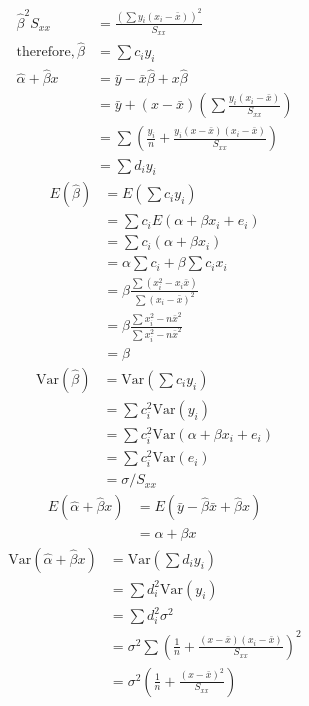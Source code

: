\documentclass{article}
\begin{document}
\begin{align*}
	\widehat{\beta}^2 S_{xx} &= \frac{(\sum y_i(x_i - \bar{x}))^2}{S_{xx}} \\
	\text{therefore,}\, \widehat{\beta}
	&= \boxed{\sum c_i y_i} \\
	\widehat{\alpha} + \widehat{\beta}x
	&= \bar{y} - \bar{x} \widehat{\beta} + x \widehat{\beta} \\
	&= \bar{y} + (x - \bar{x}) \left(\sum \frac{y_i (x_i - \bar{x})}{S_{xx}}\right) \\
	&= \sum \left(\frac{y_i}{n} + \frac{y_i (x - \bar{x})(x_i - \bar{x})}{S_{xx}}\right) \\
	&= \boxed{\sum d_i y_i}
\end{align*}
\begin{align*}
	E\left(\widehat{\beta}\right)
	&= E\left(\sum c_i y_i \right) \\
	&= \sum c_i E(\alpha + \beta x_i + e_i) \\
	&= \sum c_i (\alpha + \beta x_i) \\
	&= \alpha \sum c_i + \beta \sum c_i x_i \\
	&= \beta \frac{\sum (x_i^2 - x_i \bar{x})}{\sum (x_i - \bar{x})^2} \\
	&= \beta \frac{\sum x_i^2 - n\bar{x}^2}{\sum x_i^2 - n\bar{x}^2} \\
	&= \boxed{\beta}
\end{align*}
\begin{align*}
	\mathrm{Var}\left(\widehat{\beta}\right)
	&= \mathrm{Var}\left(\sum c_i y_i \right) \\
	&= \sum c_i^2 \mathrm{Var}(y_i) \\
	&= \sum c_i^2 \mathrm{Var}(\alpha + \beta x_i + e_i) \\
	&= \sum c_i^2 \mathrm{Var}(e_i) \\
	&= \boxed{\sigma / S_{xx}}
\end{align*}
\begin{align*}
	E\left(\widehat{\alpha} + \widehat{\beta}x\right)
	&= E\left(\bar{y} - \widehat{\beta}\bar{x} + \widehat{\beta}x\right) \\
	&= \boxed{\alpha + \beta x}
\end{align*}
\begin{align*}
	\mathrm{Var}\left(\widehat{\alpha} + \widehat{\beta}x\right)
	&= \mathrm{Var}\left(\sum d_i y_i \right) \\
	&= \sum d_i^2 \mathrm{Var}(y_i) \\
	&= \sum d_i^2 \sigma^2 \\
	&= \sigma^2 \sum \left(\frac{1}{n} + \frac{(x - \bar{x})(x_i - \bar{x})}{S_{xx}}\right)^2 \\
	&= \boxed{\sigma^2 \left(\frac{1}{n} + \frac{(x - \bar{x})^2}{S_{xx}}\right)} \\
\end{align*}
\end{document}
